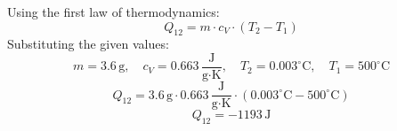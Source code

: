 Using the first law of thermodynamics:  
\[
Q_{12} = m \cdot c_V \cdot (T_2 - T_1)
\]  
Substituting the given values:  
\[
m = 3.6 \, \text{g}, \quad c_V = 0.663 \, \frac{\text{J}}{\text{g·K}}, \quad T_2 = 0.003^\circ\text{C}, \quad T_1 = 500^\circ\text{C}
\]  
\[
Q_{12} = 3.6 \, \text{g} \cdot 0.663 \, \frac{\text{J}}{\text{g·K}} \cdot (0.003^\circ\text{C} - 500^\circ\text{C})
\]  
\[
Q_{12} = -1193 \, \text{J}
\]